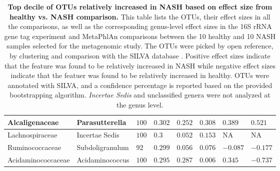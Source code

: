 \begin{table}[!ht]
\begin{tiny}
\begin{tabular}{|l|l|l|l|l|l|l|l|}
Alcaligenaceae & Parasutterella & $100$ & $0.302$ & $0.252$ & $0.308$ & $0.389$ & $0.521$ \\ \hline
Lachnospiraceae & Incertae Sedis & $100$ & $0.3$ & $0.052$ & $0.153$ & NA & NA \\ \hline
Ruminococcaceae & Subdoligranulum & $92$ & $0.299$ & $0.056$ & $0.076$ & $-0.087$ & $-0.177$ \\ \hline
Acidaminococcaceae & Acidaminococcus & $100$  & $0.295$ & $0.287$ & $0.006$ & $0.345$ & $-0.737$ \\ \hline
\end{tabular}
\end{tiny}
\caption[Top decile of OTUs relatively increased in NASH based on effect size from healthy vs. NASH comparison.]{ \textbf{Top decile of OTUs relatively increased in NASH based on effect size from healthy vs. NASH comparison.} This table lists the OTUs, their effect sizes in all the comparisons, as well as the corresponding genus-level effect sizes in the 16S rRNA gene tag experiment and MetaPhlAn comparisons between the 10 healthy and 10 NASH samples selected for the metagenomic study. The OTUs were picked by open reference, by clustering and comparison with the SILVA database \cite{quast2013silva}. Positive effect sizes indicate that the feature was found to be relatively increased in NASH while negative effect sizes indicate that the featuer was found to be relatively increased in healthy. OTUs were annotated with SILVA, and a confidence percentage is reported based on the provided bootstrapping algorithm. \textit{Incertae Sedis} and unclassified genera were not analyzed at the genus level.}
\label{nafld_top_otu_table}
\end{table}


